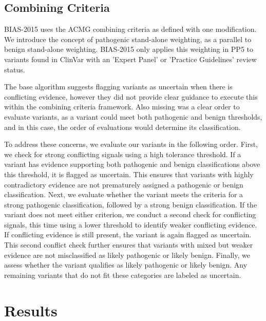 \documentclass[unnumsec,webpdf,contemporary,large]{oup-authoring-template}
\theoremstyle{thmstyleone}
\theoremstyle{thmstyletwo}
\theoremstyle{thmstylethree}
\begin{document}
\subsection{Combining Criteria}
BIAS-2015 uses the ACMG combining criteria as defined with one modification. We introduce the concept of pathogenic stand-alone weighting, as a parallel to benign stand-alone weighting.  BIAS-2015 only applies this weighting in PP5 to variants found in ClinVar with an 'Expert Panel' or 'Practice Guidelines' review status.

The base algorithm suggests flagging variants as uncertain when there is conflicting evidence, however they did not provide clear guidance to execute this within the combining criteria framework.  Also missing was a clear order to evaluate variants, as a variant could meet both pathogenic and benign thresholds, and in this case, the order of evaluations would determine its classification. 

To address these concerns, we evaluate our variants in the following order. First, we check for strong conflicting signals using a high tolerance threshold. If a variant has evidence supporting both pathogenic and benign classifications above this threshold, it is flagged as uncertain. This ensures that variants with highly contradictory evidence are not prematurely assigned a pathogenic or benign classification. Next, we evaluate whether the variant meets the criteria for a strong pathogenic classification, followed by a strong benign classification. If the variant does not meet either criterion, we conduct a second check for conflicting signals, this time using a lower threshold to identify weaker conflicting evidence. If conflicting evidence is still present, the variant is again flagged as uncertain. This second conflict check further ensures that variants with mixed but weaker evidence are not misclassified as likely pathogenic or likely benign. Finally, we assess whether the variant qualifies as likely pathogenic or likely benign. Any remaining variants that do not fit these categories are labeled as uncertain. 

\section{Results}
\end{document}
